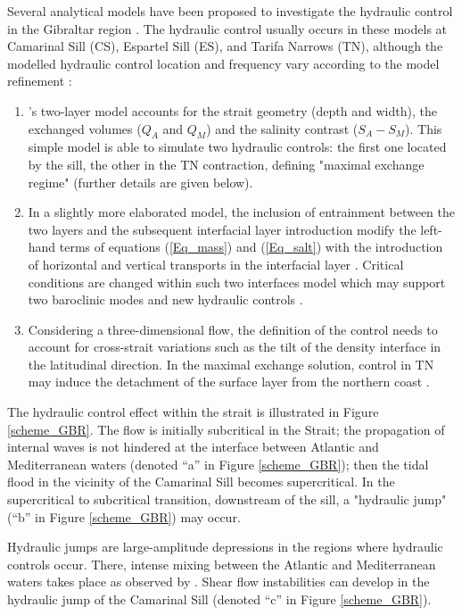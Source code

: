 Several analytical models have been proposed to investigate the hydraulic control in the Gibraltar region \citep{BS84,FA1986,Garett90}. The hydraulic control usually occurs in these models at Camarinal Sill (CS), Espartel Sill (ES), and Tarifa Narrows (TN), although the modelled hydraulic control location and frequency vary according to the model refinement :

\begin{enumerate}
\item{\citet{FA1986}'s two-layer model accounts for the strait geometry (depth and width), the exchanged volumes ($Q_A$ and $Q_M$) and the salinity contrast ($S_A -S_M$). This simple model is able to simulate two hydraulic controls: the first one located by the sill, the other in the TN contraction, defining "maximal exchange regime"  (further details are given below). }

\item{In a slightly more elaborated model, the inclusion of entrainment between the two layers and the subsequent interfacial layer introduction modify the left-hand terms of equations (\ref{Eq_mass}) and (\ref{Eq_salt}) with the introduction of horizontal and vertical transports in the interfacial layer \citep{Bray95}.  Critical conditions are changed within such two interfaces model which may support two baroclinic modes and new hydraulic controls \citep{Sannino2009b}.}

\item{Considering a three-dimensional flow, the definition of the control needs to account for cross-strait variations such as the tilt of the density interface in the latitudinal direction. In the maximal exchange solution, control in TN may induce the detachment of the surface layer from the northern coast \citep{Sannino2009b}.}
\end{enumerate}

The hydraulic control effect within the strait is illustrated in Figure \ref{scheme_GBR}. The flow is initially subcritical in the Strait; the propagation of internal waves is not hindered at the interface between Atlantic and Mediterranean waters (denoted ``a'' in Figure \ref{scheme_GBR}); then the tidal flood in the vicinity of the Camarinal Sill becomes supercritical. In the supercritical to subcritical transition, downstream of the sill, a "hydraulic jump" (``b'' in Figure \ref{scheme_GBR}) may occur.

Hydraulic jumps are large-amplitude depressions in the regions where hydraulic controls occur. There, intense mixing between the Atlantic and Mediterranean waters takes place as observed by \citet{Wesson94}. Shear flow instabilities can develop in the hydraulic jump of the Camarinal Sill (denoted ``c'' in Figure \ref{scheme_GBR}). 


